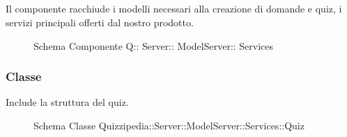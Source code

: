 \subsection{}
Il componente racchiude i modelli necessari alla creazione di domande e quiz, i servizi principali offerti dal nostro prodotto.
\begin{figure}[H]
\centering
\noindent{}
\caption[Schema Componente Quizzipedia::Server::ModelServer::Services]{Schema Componente Q:: Server:: ModelServer:: Services}
\end{figure}
\subsubsection{Classe }
Include la struttura del quiz.
\begin{figure}[H]
\centering
\noindent{}
\caption[Schema Classe Quiz]{Schema Classe Quizzipedia::Server::ModelServer::Services::Quiz}
\end{figure}
